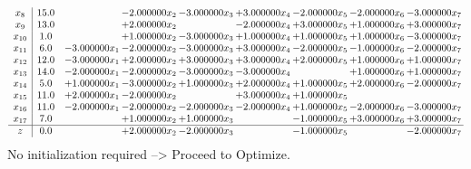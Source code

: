 \documentclass[10pt]{article}
\begin{document}
\[\begin{array}{c| c c@{\hskip 2pt} c@{\hskip 2pt} c@{\hskip 2pt} c@{\hskip 2pt} c@{\hskip 2pt} c@{\hskip 2pt} c@{\hskip 2pt} }
 x_{8}   &  15.0  &   & -2.000000 x_{2} & -3.000000 x_{3} & + 3.000000 x_{4} & -2.000000 x_{5} & -2.000000 x_{6} & -3.000000 x_{7}\\
 x_{9}   &  13.0  &   & + 2.000000 x_{2} &   & -2.000000 x_{4} & + 3.000000 x_{5} & + 1.000000 x_{6} & + 3.000000 x_{7}\\
 x_{10}   &  1.0  &   & + 1.000000 x_{2} & -3.000000 x_{3} & + 1.000000 x_{4} & + 1.000000 x_{5} & + 1.000000 x_{6} & -3.000000 x_{7}\\
 x_{11}   &  6.0 & -3.000000 x_{1} & -2.000000 x_{2} & -3.000000 x_{3} & + 3.000000 x_{4} & -2.000000 x_{5} & -1.000000 x_{6} & -2.000000 x_{7}\\
 x_{12}   &  12.0 & -3.000000 x_{1} & + 2.000000 x_{2} & + 3.000000 x_{3} & + 3.000000 x_{4} & + 2.000000 x_{5} & + 1.000000 x_{6} & + 1.000000 x_{7}\\
 x_{13}   &  14.0 & -2.000000 x_{1} & -2.000000 x_{2} & -3.000000 x_{3} & -3.000000 x_{4} &   & + 1.000000 x_{6} & + 1.000000 x_{7}\\
 x_{14}   &  5.0 & + 1.000000 x_{1} & -3.000000 x_{2} & + 1.000000 x_{3} & + 2.000000 x_{4} & + 1.000000 x_{5} & + 2.000000 x_{6} & -2.000000 x_{7}\\
 x_{15}   &  11.0 & + 2.000000 x_{1} & -2.000000 x_{2} &   & + 3.000000 x_{4} & + 1.000000 x_{5} &    &   \\
 x_{16}   &  11.0 & -2.000000 x_{1} & -2.000000 x_{2} & -2.000000 x_{3} & -2.000000 x_{4} & + 1.000000 x_{5} & -2.000000 x_{6} & -3.000000 x_{7}\\
 x_{17}   &  7.0  &   & + 1.000000 x_{2} & + 1.000000 x_{3} &   & -1.000000 x_{5} & + 3.000000 x_{6} & + 3.000000 x_{7}\\
\hline
z    &  0.0  &   & + 2.000000 x_{2} & -2.000000 x_{3} &   & -1.000000 x_{5} &   & -2.000000 x_{7}\\
\end{array}\]
No initialization required --> Proceed to Optimize. 
\end{document}
